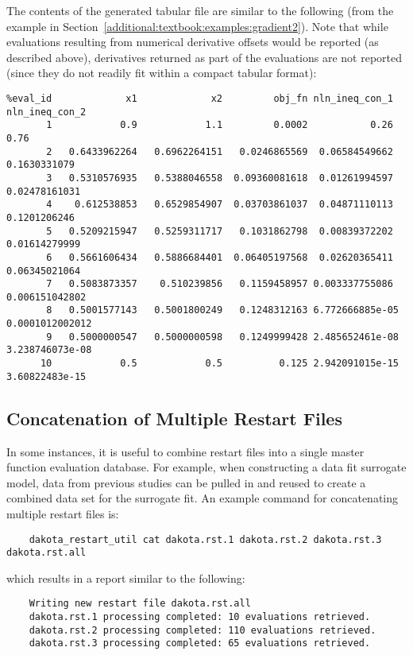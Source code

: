 The contents of the generated tabular file are similar to the following 
(from the example in Section~\ref{additional:textbook:examples:gradient2}).
Note that while evaluations resulting from numerical derivative offsets would be
reported (as described above), derivatives returned as part of the
evaluations are not reported (since they do not readily fit within a
compact tabular format):
\begin{small}
\begin{verbatim}
%eval_id             x1             x2         obj_fn nln_ineq_con_1 nln_ineq_con_2
       1            0.9            1.1         0.0002           0.26           0.76
       2   0.6433962264   0.6962264151   0.0246865569  0.06584549662   0.1630331079
       3   0.5310576935   0.5388046558  0.09360081618  0.01261994597  0.02478161031
       4    0.612538853   0.6529854907  0.03703861037  0.04871110113   0.1201206246
       5   0.5209215947   0.5259311717   0.1031862798  0.00839372202  0.01614279999
       6   0.5661606434   0.5886684401  0.06405197568  0.02620365411  0.06345021064
       7   0.5083873357    0.510239856   0.1159458957 0.003337755086 0.006151042802
       8   0.5001577143   0.5001800249   0.1248312163 6.772666885e-05 0.0001012002012
       9   0.5000000547   0.5000000598   0.1249999428 2.485652461e-08 3.238746073e-08
      10            0.5            0.5          0.125 2.942091015e-15 3.60822483e-15
\end{verbatim}
\end{small}

\subsection{Concatenation of Multiple Restart Files}\label{restart:utility:concatenation}

In some instances, it is useful to combine restart files into a single
master function evaluation database. For example, when constructing a
data fit surrogate model, data from previous studies can be pulled in
and reused to create a combined data set for the surrogate fit. An
example command for concatenating multiple restart files is:
\begin{small}
\begin{verbatim}
    dakota_restart_util cat dakota.rst.1 dakota.rst.2 dakota.rst.3 dakota.rst.all
\end{verbatim}
\end{small}
which results in a report similar to the following:
\begin{verbatim}
    Writing new restart file dakota.rst.all
    dakota.rst.1 processing completed: 10 evaluations retrieved.
    dakota.rst.2 processing completed: 110 evaluations retrieved.
    dakota.rst.3 processing completed: 65 evaluations retrieved.
\end{verbatim}

